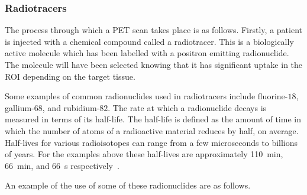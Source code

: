             \subsubsection{Radiotracers} \label{sec:radiotracers}
                The process through which a \gls{PET} scan takes place is as follows. Firstly, a patient is injected with a chemical compound called a radiotracer. This is a biologically active molecule which has been labelled with a positron emitting radionuclide. The molecule will have been selected knowing that it has significant uptake in the \gls{ROI} depending on the target tissue. %
                
                Some examples of common radionuclides used in radiotracers include fluorine-$18$, gallium-$68$, and rubidium-$82$. %
                The rate at which a radionuclide decays is measured in terms of its half-life. The half-life is defined as the amount of time in which the number of atoms of a radioactive material reduces by half, on average. Half-lives for various radioisotopes can range from a few microseconds to billions of years. For the examples above these half-lives are approximately \SI{110}{\minute}, \SI{66}{\minute}, and \SI{66}{\second} respectively~\parencite{FDGGuidelines}. %
                
                An example of the use of some of these radionuclides are as follows.
                
